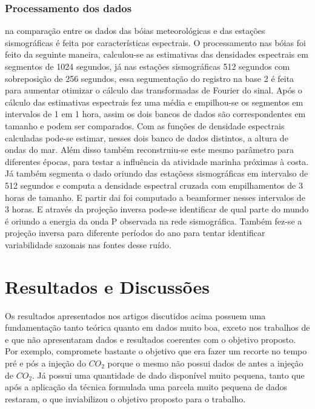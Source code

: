 \documentclass[paper,twocolumn]{geophysics}
\begin{document}
\subsubsection*{Processamento dos dados}

\cite{bromirski_ocean_1999} na comparação entre os dados das bóias meteorológicas e das estações sismográficas é feita por características espectrais. O processamento nas bóias foi feito da seguinte maneira, calculou-se as estimativas das densidades espectrais em segmentos de 1024 segundos, já nas estações sismográficas 512 segundos com sobreposição de 256 segundos, essa segumentação do registro na base 2 é feita para aumentar otimizar o cálculo das transformadas de Fourier do sinal. Após o cálculo das estimativas espectrais fez uma média e empilhou-se os segmentos em intervalos de 1 em 1 hora, assim os dois bancos de dados são correspondentes em tamanho e podem ser comparados. Com as funções de densidade espectrais calculadas pode-se estimar, nesses dois banco de dados distintos, a altura de ondas do mar. Além disso também reconstruiu-se este mesmo parâmetro para diferentes épocas, para testar a influência da atividade marinha próximas à costa. Já \cite{gerstoft_global_2008} também segmenta o dado oriundo das estaçõess sismográficas em intervalso de 512 segundos e computa a densidade espectral cruzada com empilhamentos de 3 horas de tamanho. E partir dai foi computado a beamformer nesses intervalos de 3 horas. E através da projeção inversa pode-se identificar de qual parte do mundo é oriundo a energia da onda P observada na rede sismográfica. Também fez-se a projeção inversa para diferente períodos do ano para tentar identificar variabilidade sazonais nas fontes desse ruído. 

\section*{Resultados e Discussões}

Os resultados apresentados nos artigos discutidos acima possuem uma fundamentação tanto teórica quanto em dados muito boa, exceto nos trabalhos de \cite{vidal_retrieval_2014} e \cite{boullenger_studying_2015} que não apresentaram dados e resultados coerentes com o objetivo proposto. Por exemplo, \cite{boullenger_studying_2015}compromete bastante o objetivo que era fazer um recorte no tempo pré e pós a injeção do $CO_{2}$ porque o mesmo não possui dados de antes a injeção de $CO_{2}$. Já \cite{vidal_retrieval_2014} possui uma quantidade de dado disponível muito pequena, tanto que após a aplicação da técnica formulada uma parcela muito pequena de dados restaram, o que inviabilizou o objetivo proposto para o trabalho. 
\end{document}
